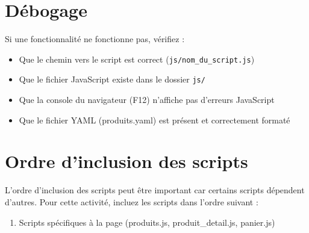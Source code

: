 \documentclass[11pt]{article}
\begin{document}
\section{Débogage}

Si une fonctionnalité ne fonctionne pas, vérifiez :

\begin{itemize}
\item Que le chemin vers le script est correct (\texttt{js/nom\_du\_script.js})
\item Que le fichier JavaScript existe dans le dossier \texttt{js/}
\item Que la console du navigateur (F12) n'affiche pas d'erreurs JavaScript
\item Que le fichier YAML (produits.yaml) est présent et correctement formaté
\end{itemize}

\section{Ordre d'inclusion des scripts}

L'ordre d'inclusion des scripts peut être important car certains scripts dépendent d'autres. Pour cette activité, incluez les scripts dans l'ordre suivant :

\begin{enumerate}
\item Scripts spécifiques à la page (produits.js, produit\_detail.js, panier.js)
\end{enumerate}
\end{document}
